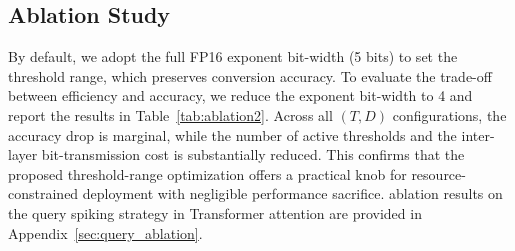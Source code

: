 

\subsection{Ablation Study}

By default, we adopt the full FP16 exponent bit-width (5 bits) to set the threshold range, which preserves conversion accuracy. To evaluate the trade-off between efficiency and accuracy, we reduce the exponent bit-width to 4 and report the results in Table~\ref{tab:ablation2}. Across all $(T, D)$ configurations, the accuracy drop is marginal, while the number of active thresholds and the inter-layer bit-transmission cost is substantially reduced. This confirms that the proposed threshold-range optimization offers a practical knob for resource-constrained deployment with negligible performance sacrifice.
 ablation results on  the query spiking strategy in Transformer attention are provided in Appendix~\ref{sec:query_ablation}.

